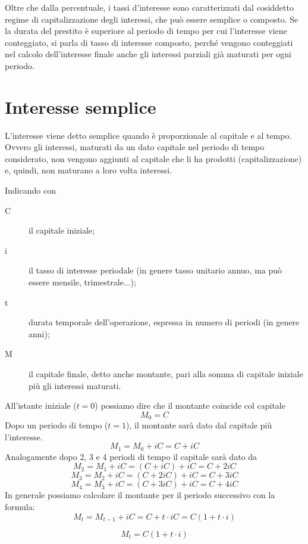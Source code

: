 Oltre che dalla percentuale, i tassi d'interesse sono caratterizzati dal 
cosiddetto regime di capitalizzazione degli interessi, che può essere semplice 
o composto. Se la durata del prestito è superiore al periodo di tempo per cui 
l'interesse viene conteggiato, si parla di tasso di interesse composto, perché 
vengono conteggiati nel calcolo dell'interesse finale anche gli interessi 
parziali già maturati per ogni periodo.

\section{Interesse semplice}
L'interesse viene detto semplice quando è proporzionale al capitale e al tempo. 
Ovvero gli interessi, maturati da un dato capitale nel periodo di tempo 
considerato, non vengono aggiunti al capitale che li ha prodotti 
(capitalizzazione) e, quindi, non maturano a loro volta interessi.

Indicando con

\begin{description}
\item [C] il capitale iniziale;
\item [i] il tasso di interesse periodale (in genere tasso unitario annuo, ma 
può essere mensile, trimestrale...);
\item [t] durata temporale dell'operazione, espressa in numero di periodi (in 
genere anni);
\item [M] il capitale finale, detto anche montante, pari alla somma di capitale 
iniziale più gli interessi maturati. 
\end{description}

All'istante iniziale ($t=0$) possiamo dire che il montante coincide col 
capitale $$ M_{0}=C $$
Dopo un periodo di tempo ($t=1$), il montante sarà dato dal capitale più 
l'interesse. 
$$ M_{1}=M_{0} +iC = C + iC $$
Analogamente dopo 2, 3 e 4 periodi di tempo il capitale sarà dato da 
$$ M_{2}=M_{1} +iC = (C + iC) +iC = C +2iC$$
$$ M_{3}=M_{2} +iC = (C + 2iC) +iC = C +3iC$$
$$ M_{4}=M_{3} +iC = (C + 3iC) +iC = C +4iC$$
In generale possiamo calcolare il montante per il periodo successivo con la 
formula:
$$ M_{t}=M_{t-1}+iC=C+t\cdot iC=C(1+t\cdot i) $$
\begin{definizione}
$$ M_{t}=C(1+t\cdot i) $$
\end{definizione}

